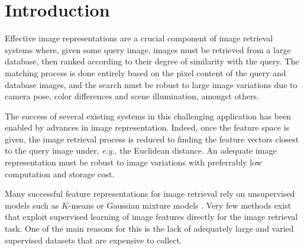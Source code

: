 \section{Introduction}

Effective image 
representations are a crucial component of image retrieval systems 
where, given some query image,  images must be retrieved from a large 
database, then ranked according to their degree of similarity with the 
query.
The matching process is done entirely based on the pixel content of the query and database images, and the search must be robust to large image variations due to camera pose, color differences and scene illumination, amongst others.


The success of several existing systems in this challenging application has been enabled by advances in image representation. 
Indeed, once the feature space is given,
the image retrieval process is reduced to finding the feature vectors closest to the query image under, \textit{e.g.}, the Euclidean distance. An adequate image representation must be robust to image variations with preferrably low computation and storage cost.


Many successful feature representations for image retrieval rely on unsupervised models such as $K$-means \cite{Delhumeau2013} or Gaussian mixture models \cite{Perronnin2010}. Very few methods \cite{Arandjelovic15,Bilen2015,Rana} exist that exploit supervised learning of image features directly for the image retrieval task. One of the main reasons for this is the lack of adequately large and varied supervised datasets that are expensive to collect.

